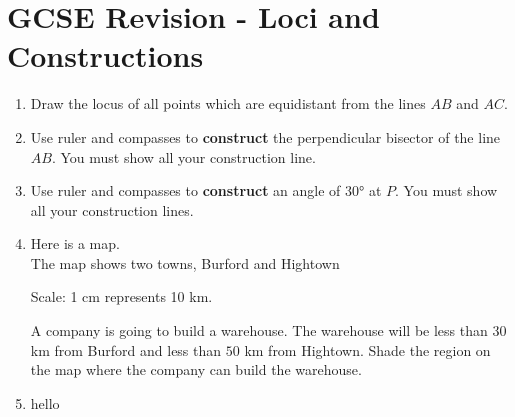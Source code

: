 
\chapter{GCSE Revision - Loci and Constructions}

\begin{enumerate}
  \item Draw the locus of all points which are equidistant from the lines $AB$ and $AC$.
  \begin{figure}[H]
    \centering
  \end{figure}
  \item Use ruler and compasses to \textbf{construct} the perpendicular bisector of the line $AB$. You must show all your construction line.\strch
  \begin{figure}[H]
    \centering
  \end{figure}
  \newpage
  \item Use ruler and compasses to \textbf{construct} an angle of $\ang{30}$ at $P$. You must show all your construction lines.\strch
  \begin{figure}[H]
    \centering
  \end{figure}
  \item Here is a map.\\
  The map shows two towns, Burford and Hightown
  \begin{figure}[H]
    \centering
  \end{figure}
  Scale: 1 cm represents 10 km.\par 
  A company is going to build a warehouse. The warehouse will be less than $30$ km from Burford and less than $50$ km from Hightown. Shade the region on the map where the company can build the warehouse.
  \newpage
  \item hello
  
\end{enumerate}